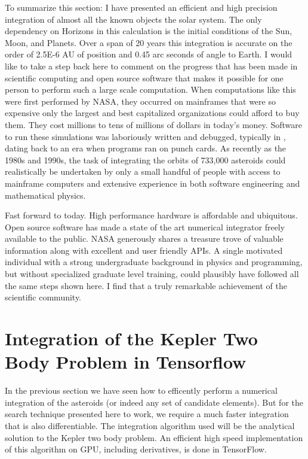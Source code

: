 To summarize this section: I have presented an efficient and high precision integration of almost all the known objects the solar system.
The only dependency on Horizons in this calculation is the initial conditions of the Sun, Moon, and Planets.
Over a span of 20 years this integration is accurate on the order of 2.5E-6 AU of position and 0.45 arc seconds of angle to Earth.
I would like to take a step back here to comment on the progress that has been made in scientific computing and open source software
that makes it possible for one person to perform such a large scale computation.
When computations like this were first performed by NASA, they occurred on mainframes that were so expensive only the largest 
and best capitalized organizations could afford to buy them.
They cost millions to tens of millions of dollars in today's money.
Software to run these simulations was laboriously written and debugged, typically in , dating back to an era when programs ran on punch cards.
As recently as the 1980s and 1990s, the task of integrating the orbits of 733,000 asteroids could realistically be undertaken by only a small
handful of people with access to mainframe computers and extensive experience in both software engineering and mathematical physics.

Fast forward to today.  
High performance hardware is affordable and ubiquitous.
Open source software has made a state of the art numerical integrator freely available to the public.
NASA generously shares a treasure trove of valuable information along with excellent and user friendly APIs.
A single motivated individual with a strong undergraduate background in physics and programming,
but without specialized graduate level training, could plausibly have followed all the same steps shown here.
I find that a truly remarkable achievement of the scientific community.

\section{Integration of the Kepler Two Body Problem in Tensorflow}
\label{section_kepler_two_body_tensorflow}
In the previous section we have seen how to efficently perform a numerical integration of the asteroids (or indeed any set of candidate elements).
But for the search technique presented here to work, we require a much faster integration that is also differentiable.
The integration algorithm used will be the analytical solution to the Kepler two body problem.
An efficient high speed implementation of this algorithm on GPU, including derivatives, is done in TensorFlow.

